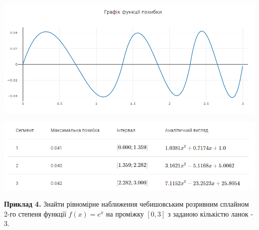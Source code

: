 \documentclass[ukrainian,14pt]{extarticle}
\begin{document}
\vspace{0.5cm}

\includegraphics[scale=0.65]{examples/3_error.png}

\vspace{0.5cm}

\includegraphics[scale=0.8]{examples/3_table.png}

\vspace{1cm}

\textbf{Приклад 4.} Знайти рівномірне наближення чебишовським розривним сплайном 2-го степеня функції $f(x)=e^x$ на проміжку $[0, 3]$ з заданою кількістю ланок - $3$.
\end{document}
